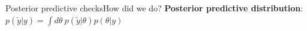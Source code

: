 \documentclass{beamer}
\begin{document}
	\begin{frame}{Posterior predictive checks}{How did we do?}
		\textbf{Posterior predictive distribution}: $p(\widetilde{y}| y) = \int d\theta ~ p(\widetilde{y}|\theta) p(\theta | y)$
		
	
		
	\end{frame}
\end{document}
